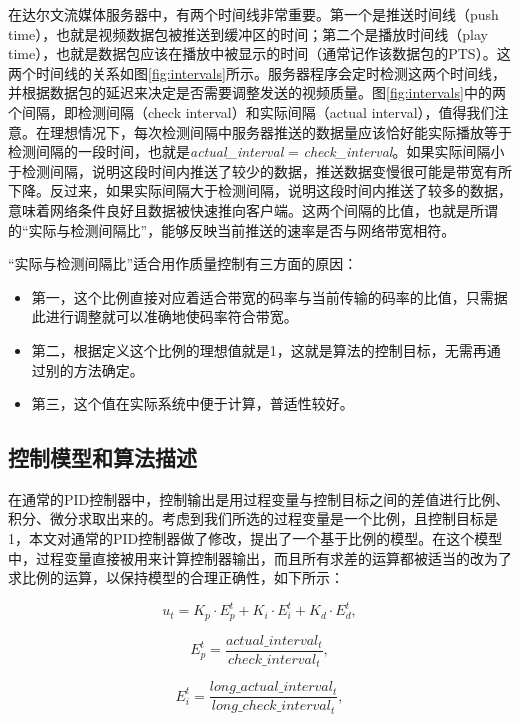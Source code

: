 在达尔文流媒体服务器中，有两个时间线非常重要。第一个是推送时间线（push time），也就是视频数据包被推送到缓冲区的时间；第二个是播放时间线（play time），也就是数据包应该在播放中被显示的时间（通常记作该数据包的PTS）。这两个时间线的关系如图\ref{fig:intervals}所示。服务器程序会定时检测这两个时间线，并根据数据包的延迟来决定是否需要调整发送的视频质量。图\ref{fig:intervals}中的两个间隔，即检测间隔（check interval）和实际间隔（actual interval），值得我们注意。在理想情况下，每次检测间隔中服务器推送的数据量应该恰好能实际播放等于检测间隔的一段时间，也就是\textit{actual\_interval} = \textit{check\_interval}。如果实际间隔小于检测间隔，说明这段时间内推送了较少的数据，推送数据变慢很可能是带宽有所下降。反过来，如果实际间隔大于检测间隔，说明这段时间内推送了较多的数据，意味着网络条件良好且数据被快速推向客户端。这两个间隔的比值，也就是所谓的“实际与检测间隔比”，能够反映当前推送的速率是否与网络带宽相符。

“实际与检测间隔比”适合用作质量控制有三方面的原因：
\begin{itemize}
	\item 第一，这个比例直接对应着适合带宽的码率与当前传输的码率的比值，只需据此进行调整就可以准确地使码率符合带宽。
	\item 第二，根据定义这个比例的理想值就是1，这就是算法的控制目标，无需再通过别的方法确定。
	\item 第三，这个值在实际系统中便于计算，普适性较好。
\end{itemize}

\subsection{控制模型和算法描述}

在通常的PID控制器中，控制输出是用过程变量与控制目标之间的差值进行比例、积分、微分求取出来的。考虑到我们所选的过程变量是一个比例，且控制目标是1，本文对通常的PID控制器做了修改，提出了一个基于比例的模型。在这个模型中，过程变量直接被用来计算控制器输出，而且所有求差的运算都被适当的改为了求比例的运算，以保持模型的合理正确性，如下所示：

\begin{equation}
\label{eq:ut}
{u_t} = {K_p} \cdot E_p^t + {K_i} \cdot E_i^t + {K_d} \cdot E_d^t ,
\end{equation}

\begin{equation}
\label{eq:ep}
E_p^t = \frac{{actual\_interva{l_t}}}{{check\_interva{l_t}}} ,
\end{equation}

\begin{equation}
\label{eq:ei}
E_i^t = \frac{{long\_actual\_interva{l_t}}}{{long\_check\_interva{l_t}}} ,
\end{equation}

